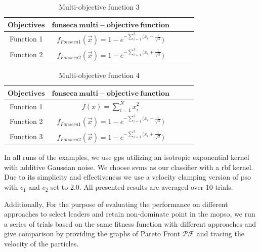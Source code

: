 \documentclass[11pt, runningheads,a4paper]{llncs}
\begin{document}
\begin{table}
  \caption{Multi-objective function 3}  
  \label{tab:f3}
    \begin{center}
\begin{tabular}{c|cccc} 
\toprule 
	$\mathbf{Objectives}$ & $\mathbf{fonseca\ multi-objective\ function}$\\
	\hline Function 1& $f_{Fonseca1}(\vec{x})=1-e^{-\sum_{i=1}^3 (x_i - \frac{1}{\sqrt{3}}} )$\\
	Function 2&$ f_{Fonseca2}(\vec{x})=1-e^{-\sum_{i=1}^3 (x_i + \frac{1}{\sqrt{3}}} )$\\
\bottomrule 
\end{tabular} 
\end{center}
\end{table}
\begin{table}
  \caption{Multi-objective function 4}  
  \label{tab:f4}
    \begin{center}
\begin{tabular}{c|cccc} 
\toprule 
	 $\mathbf{Objectives}$ & $\mathbf{fonseca\ multi-objective\ function}$\\
	\hline Function 1& $f(x) = \sum_{i=1}^{N} x_i^2$\\
	Function 2& $f_{Fonseca1}(\vec{x})=1-e^{-\sum_{i=1}^3 (x_i - \frac{1}{\sqrt{3}}} )$\\
	Function 3& $ f_{Fonseca2}(\vec{x})=1-e^{-\sum_{i=1}^3 (x_i + \frac{1}{\sqrt{3}}} )$\\
\bottomrule 
\end{tabular} 
\end{center}
\end{table}



In all runs of the examples, we use \acp{gp} utilizing an isotropic exponential kernel with additive Gaussian noise. We choose \acp{svm} as our classifier with a \ac{rbf} kernel. Due to its simplicity and effectiveness we use a velocity clamping version of \ac{pso} with $c_1$ and $c_2$ set to 2.0. All presented results are averaged over 10 trials. 

Additionally, For the purpose of evaluating the performance on different approaches to select leaders and retain non-dominate point in the \ac{mopso}, we run a series of trials based on the same fitness function with different approaches and give comparison by providing the graphs of Pareto Front $\mathcal{PF}$ and tracing the velocity of the particles.
\end{document}

